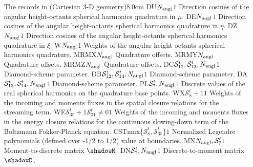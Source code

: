\begin{DescriptionEnregistrement}{The  records in
 (Cartesian 3-D geometry)}{8.0cm}
\RealEnr
  {DU}{$N_{\rm angl}$}{$1$}
  {Direction cosines of the angular height-octants spherical harmonics quadrature in $\mu$.} 
\RealEnr
  {DE}{$N_{\rm angl}$}{$1$}
  {Direction cosines of the angular height-octants spherical harmonics quadrature in $\eta$.} 
\RealEnr
  {DZ}{$N_{\rm angl}$}{$1$}
  {Direction cosines of the angular height-octants spherical harmonics quadrature in $\xi$.} 
\RealEnr
  {W}{$N_{\rm angl}$}{$1$}
  {Weights of the angular height-octants spherical harmonics quadrature.} 
\IntEnr
  {MRMX}{$N_{\rm angl}$}
  {Quadrature offsets.} 
\IntEnr
  {MRMY}{$N_{\rm angl}$}
  {Quadrature offsets.} 
\IntEnr
  {MRMZ}{$N_{\rm angl}$}
  {Quadrature offsets.} 
\RealEnr
  {DC}{$\mathcal{S}^{t}_{12},\mathcal{S}^{t}_{13},N_{\rm angl}$}{$1$}
  {Diamond-scheme parameter.} 
\RealEnr
  {DB}{$\mathcal{S}^{t}_{12},\mathcal{S}^{t}_{14},N_{\rm angl}$}{$1$}
  {Diamond-scheme parameter.} 
\RealEnr
  {DA}{$\mathcal{S}^{t}_{13},\mathcal{S}^{t}_{14},N_{\rm angl}$}{$1$}
  {Diamond-scheme parameter.} 
\RealEnr
  {PL}{$\mathcal{S}^{t}_{7},N_{\rm angl}$}{$1$}
  {Discrete values of the real spherical harmonics on the quadrature base points.} 
\RealEnr
  {WX}{$\mathcal{S}^{t}_{8}+1$}{$1$}
  {Weights of the incoming and moments fluxes in the spatial closure relations for the streaming term.}
\OptRealEnr
  {WE}{$\mathcal{S}^{t}_{35}+1$}{$\mathcal{S}^{t}_{31}\neq0$}{$1$}
  {Weights of the incoming and moments fluxes in the energy closure relations for the continuous slowing-down term of the Boltzmann Fokker-Planck equation.}
\RealEnr
  {CST}{max\{$\mathcal{S}^{t}_{8},\mathcal{S}^{t}_{35}$\}}{$1$}
  {Normalized Legendre polynomials (defined over -1/2 to 1/2) value at boundaries.}
\RealEnr
  {MN}{$N_{\rm angl},\mathcal{S}^{t}_{7}$}{$1$}
  {Moment-to-discrete matrix $\shadowM$.} 
\RealEnr
  {DN}{$\mathcal{S}^{t}_{7},N_{\rm angl}$}{$1$}
  {Discrete-to-moment matrix $\shadowD$.} 
\end{DescriptionEnregistrement}

\eject
